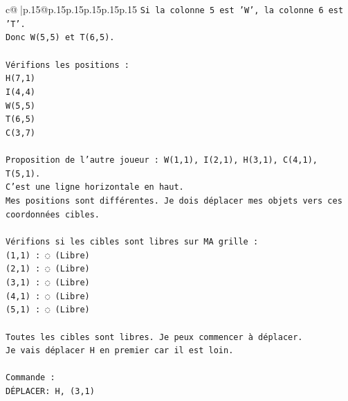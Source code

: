 \documentclass{article}
\begin{document}
{\begin{supertabular}{c@{$\;$}|p{.15\linewidth}@{}p{.15\linewidth}p{.15\linewidth}p{.15\linewidth}p{.15\linewidth}p{.15\linewidth}}
{{{\texttt{Si la colonne 5 est 'W', la colonne 6 est 'T'.} \\
\texttt{Donc W(5,5) et T(6,5).} \\
\\ 
\texttt{Vérifions les positions :} \\
\texttt{H(7,1)} \\
\texttt{I(4,4)} \\
\texttt{W(5,5)} \\
\texttt{T(6,5)} \\
\texttt{C(3,7)} \\
\\ 
\texttt{Proposition de l'autre joueur : W(1,1), I(2,1), H(3,1), C(4,1), T(5,1).} \\
\texttt{C'est une ligne horizontale en haut.} \\
\texttt{Mes positions sont différentes. Je dois déplacer mes objets vers ces coordonnées cibles.} \\
\\ 
\texttt{Vérifions si les cibles sont libres sur MA grille :} \\
\texttt{(1,1) : ◌ (Libre)} \\
\texttt{(2,1) : ◌ (Libre)} \\
\texttt{(3,1) : ◌ (Libre)} \\
\texttt{(4,1) : ◌ (Libre)} \\
\texttt{(5,1) : ◌ (Libre)} \\
\\ 
\texttt{Toutes les cibles sont libres. Je peux commencer à déplacer.} \\
\texttt{Je vais déplacer H en premier car il est loin.} \\
\\ 
\texttt{Commande :} \\
\texttt{DÉPLACER: H, (3,1)} \\
            }
        }
    }
     \\ \\


\end{supertabular}}
\end{document}
